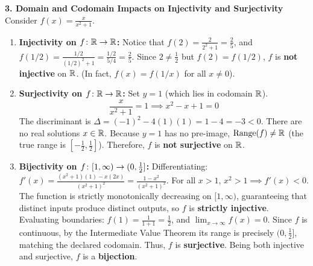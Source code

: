 \textbf{3. Domain and Codomain Impacts on Injectivity and Surjectivity}
Consider $f(x) = \frac{x}{x^2 + 1}$.
\begin{enumerate}
    \item \textbf{Injectivity on $f \colon \mathbb{R} \to \mathbb{R}$:}
    Notice that $f(2) = \frac{2}{2^2 + 1} = \frac{2}{5}$, and $f(1/2) = \frac{1/2}{(1/2)^2 + 1} = \frac{1/2}{5/4} = \frac{2}{5}$.
    Since $2 \neq \frac{1}{2}$ but $f(2) = f(1/2)$, $f$ is \textbf{not injective} on $\mathbb{R}$. (In fact, $f(x) = f(1/x)$ for all $x \neq 0$).
    \item \textbf{Surjectivity on $f \colon \mathbb{R} \to \mathbb{R}$:}
    Set $y = 1$ (which lies in codomain $\mathbb{R}$).
    $$\frac{x}{x^2 + 1} = 1 \implies x^2 - x + 1 = 0$$
    The discriminant is $\Delta = (-1)^2 - 4(1)(1) = 1 - 4 = -3 < 0$. There are no real solutions $x \in \mathbb{R}$.
    Because $y = 1$ has no pre-image, $\text{Range}(f) \neq \mathbb{R}$ (the true range is $[-\frac{1}{2}, \frac{1}{2}]$). Therefore, $f$ is \textbf{not surjective} on $\mathbb{R}$.
    \item \textbf{Bijectivity on $f \colon [1, \infty) \to (0, \frac{1}{2}]$:}
    Differentiating: $f'(x) = \frac{(x^2 + 1)(1) - x(2x)}{(x^2 + 1)^2} = \frac{1 - x^2}{(x^2 + 1)^2}$.
    For all $x > 1$, $x^2 > 1 \implies f'(x) < 0$. The function is strictly monotonically decreasing on $[1, \infty)$, guaranteeing that distinct inputs produce distinct outputs, so $f$ is \textbf{strictly injective}.
    Evaluating boundaries: $f(1) = \frac{1}{1 + 1} = \frac{1}{2}$, and $\lim_{x \to \infty} f(x) = 0$. Since $f$ is continuous, by the Intermediate Value Theorem its range is precisely $(0, \frac{1}{2}]$, matching the declared codomain. Thus, $f$ is \textbf{surjective}.
    Being both injective and surjective, $f$ is a \textbf{bijection}.
\end{enumerate}

